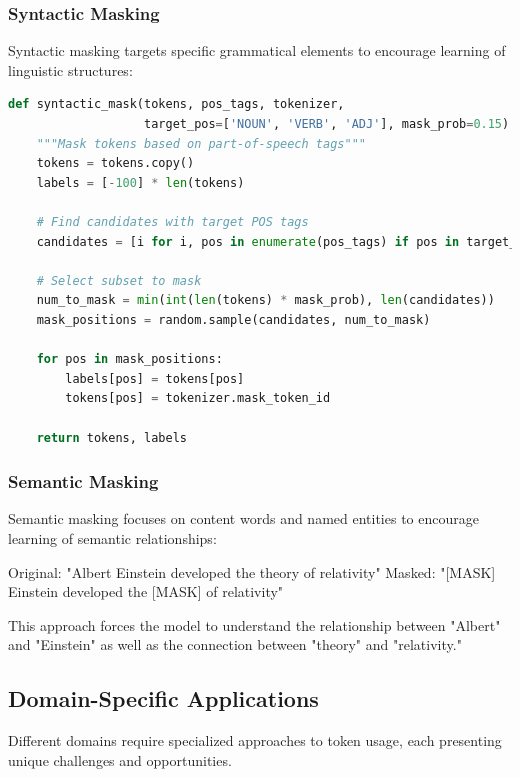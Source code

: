\subsubsection{Syntactic Masking}

Syntactic masking targets specific grammatical elements to encourage learning of linguistic structures:

\begin{lstlisting}[language=Python, caption=Syntactic masking based on POS tags]
def syntactic_mask(tokens, pos_tags, tokenizer, 
                   target_pos=['NOUN', 'VERB', 'ADJ'], mask_prob=0.15):
    """Mask tokens based on part-of-speech tags"""
    tokens = tokens.copy()
    labels = [-100] * len(tokens)
    
    # Find candidates with target POS tags
    candidates = [i for i, pos in enumerate(pos_tags) if pos in target_pos]
    
    # Select subset to mask
    num_to_mask = min(int(len(tokens) * mask_prob), len(candidates))
    mask_positions = random.sample(candidates, num_to_mask)
    
    for pos in mask_positions:
        labels[pos] = tokens[pos]
        tokens[pos] = tokenizer.mask_token_id
    
    return tokens, labels
\end{lstlisting}

\subsubsection{Semantic Masking}

Semantic masking focuses on content words and named entities to encourage learning of semantic relationships:

\begin{example}
Original: "Albert Einstein developed the theory of relativity"
Masked: "[MASK] Einstein developed the [MASK] of relativity"

This approach forces the model to understand the relationship between "Albert" and "Einstein" as well as the connection between "theory" and "relativity."
\end{example}

\subsection{Domain-Specific Applications}

Different domains require specialized approaches to \mask{} token usage, each presenting unique challenges and opportunities.


